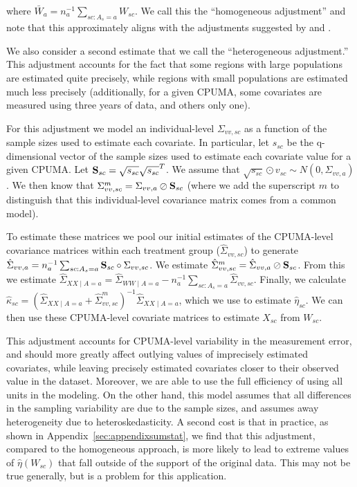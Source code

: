 where $\bar{W}_a = n_a^{-1}\sum_{sc: A_s = a} W_{sc}$. We call this the ``homogeneous adjustment'' and note that this approximately aligns with the adjustments suggested by \cite{carroll2006measurement} and \cite{gleser1992importance}. 

We also consider a second estimate that we call the ``heterogeneous adjustment.'' This adjustment accounts for the fact that some regions with large populations are estimated quite precisely, while regions with small populations are estimated much less precisely (additionally, for a given CPUMA, some covariates are measured using three years of data, and others only one). 

For this adjustment we model an individual-level $\Sigma_{vv, sc}$ as a function of the sample sizes used to estimate each covariate. In particular, let $s_{sc}$ be the q-dimensional vector of the sample sizes used to estimate each covariate value for a given CPUMA. Let $\mathbf{S}_{sc} = \sqrt{s_{sc}}\sqrt{s_{sc}}^T$. We assume that $\sqrt{s_{sc}} \odot v_{sc} \sim N(0, \Sigma_{vv, a})$. We then know that $\Sigma_{vv, sc}^m = \Sigma_{vv, a} \oslash \mathbf{S}_{sc}$ (where we add the superscript $m$ to distinguish that this individual-level covariance matrix comes from a common model).

To estimate these matrices we pool our initial estimates of the CPUMA-level covariance matrices within each treatment group ($\hat{\Sigma}_{vv, sc}$) to generate $\hat{\Sigma}_{vv, a} = n_a^{-1}\sum_{sc: A_s = a} \mathbf{S}_{sc} \circ \Sigma_{vv, sc}$. We estimate $\hat{\Sigma}_{vv, sc}^m = \hat{\Sigma}_{vv, a} \oslash \mathbf{S}_{sc}$. From this we estimate $\hat{\Sigma}_{XX \mid A = a} = \hat{\Sigma}_{WW \mid A = a} - n_a^{-1}\sum_{sc: A_s = a}\hat{\Sigma}_{vv, sc}$. Finally, we calculate $\hat{\kappa}_{sc} = (\hat{\Sigma}_{XX \mid A = a} + \hat{\Sigma}_{vv, sc}^m)^{-1}\hat{\Sigma}_{XX \mid A = a}$, which we use to estimate $\hat{\eta}_{sc}$. We can then use these CPUMA-level covariate matrices to estimate $X_{sc}$ from $W_{sc}$.

This adjustment accounts for CPUMA-level variability in the measurement error, and should more greatly affect outlying values of imprecisely estimated covariates, while leaving precisely estimated covariates closer to their observed value in the dataset. Moreover, we are able to use the full efficiency of using all units in the modeling. On the other hand, this model assumes that all differences in the sampling variability are due to the sample sizes, and assumes away heterogeneity due to heteroskedasticity. A second cost is that in practice, as shown in Appendix~\ref{sec:appendixsumstat}, we find that this adjustment, compared to the homogeneous approach, is more likely to lead to extreme values of $\hat{\eta}(W_{sc})$ that fall outside of the support of the original data. This may not be true generally, but is a problem for this application. 